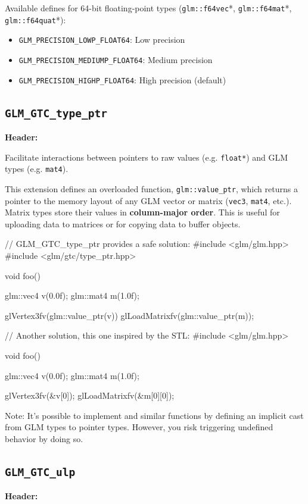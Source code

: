 \documentclass{scrartcl}
\numberwithin{figure}{subsection}
\begin{document}
Available defines for 64-bit floating-point types (\verb|glm::f64vec|*, \verb|glm::f64mat|*, \verb|glm::f64quat|*):

\begin{itemize}
    \item \verb|GLM_PRECISION_LOWP_FLOAT64|: Low precision
    \item \verb|GLM_PRECISION_MEDIUMP_FLOAT64|: Medium precision
    \item \verb|GLM_PRECISION_HIGHP_FLOAT64|: High precision (default)
\end{itemize}

\subsection{\texttt{GLM\_GTC\_type\_ptr}}
\textbf{Header:} 

Facilitate interactions between pointers to raw values (e.g. \verb|float*|) and GLM types (e.g. \verb|mat4|).

This extension defines an overloaded function, \verb|glm::value_ptr|, which returns a pointer to the memory layout of any GLM vector or matrix (\verb|vec3|, \verb|mat4|, etc.).  Matrix types store their values in \textbf{column-major order}.  This is useful for uploading data to matrices or for copying data to buffer objects.

\begin{cppcode}
// GLM_GTC_type_ptr provides a safe solution:
#include <glm/glm.hpp>
#include <glm/gtc/type_ptr.hpp>

void foo()
{
  glm::vec4 v(0.0f);
  glm::mat4 m(1.0f);

  glVertex3fv(glm::value_ptr(v)) 
  glLoadMatrixfv(glm::value_ptr(m));
}
\end{cppcode}

\begin{cppcode}
// Another solution, this one inspired by the STL:
#include <glm/glm.hpp>

void foo()
{
  glm::vec4 v(0.0f);
  glm::mat4 m(1.0f);

  glVertex3fv(&v[0]);
  glLoadMatrixfv(&m[0][0]);
}
\end{cppcode}

Note: It's possible to implement  and similar functions by defining an implicit cast from GLM types to pointer types.  However, you risk triggering undefined behavior by doing so.

\subsection{\texttt{GLM\_GTC\_ulp}}
\textbf{Header:} 
\end{document}
